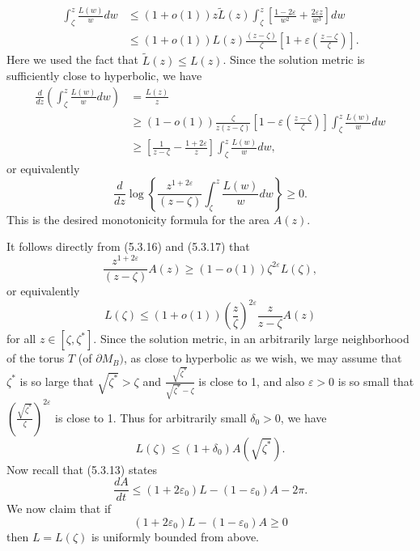 \begin{align*}
\int_{\zeta}^{z} \frac{L(w)}{w}dw &  \leq (1+o(1))
z\tilde{L}(z)\int_{\zeta}^{z}
\left[\frac{1-2\varepsilon}{w^2}+\frac{2\varepsilon z}{w^3}\right]dw \\
& \leq (1+o(1))L(z)\frac{(z-\zeta)}{\zeta}
\left[1+\varepsilon\left(\frac{z-\zeta}{\zeta}\right)\right].
\end{align*}
Here we used the fact that $\tilde{L}(z)\leq L(z)$. Since the
solution metric is sufficiently close to hyperbolic, we have
\begin{align*}
\frac{d}{dz}\left(\int_{\zeta}^{z}\frac{L(w)}{w}dw\right)
&  = \frac{L(z)}{z}\\
& \geq(1-o(1))\frac{\zeta}{z(z-\zeta)}
\left[1-\varepsilon\left(\frac{z-\zeta}{\zeta}\right)\right]
\int_{\zeta}^{z}\frac{L(w)}{w}dw \\
&  \geq\left[\frac{1}{z-\zeta}-\frac{1+2\varepsilon}{z}\right]
\int_{\zeta}^{z}\frac{L(w)}{w}dw,
\end{align*}
or equivalently \begin{equation} \frac{d}{dz}\log\left\{
\frac{z^{1+2\varepsilon}}{(z-\zeta)}
\int_{\zeta}^{z}\frac{L(w)}{w}dw\right\}\geq 0.
\end{equation} This is the desired monotonicity formula for the area $A(z)$.

It follows directly from (5.3.16) and (5.3.17) that
$$
\frac{z^{1+2\varepsilon}}{(z-\zeta)}A(z)\geq
(1-o(1))\zeta^{2\varepsilon}L(\zeta),
$$
or equivalently
$$
L(\zeta)\leq (1+o(1))
\left(\frac{z}{\zeta}\right)^{2\varepsilon}\frac{z}{z-\zeta} A(z)
$$
for all $z\in [\zeta,\zeta^{\ast}]$. Since the solution metric, in
an arbitrarily large neighborhood of the torus $T$ (of $\partial
M_B)$, as close to hyperbolic as we wish, we may assume that
${\zeta}^{\ast}$ is so large that $\sqrt{\zeta^{\ast}}>\zeta$ and
$\frac{\sqrt{\zeta^{\ast}}}{\sqrt{\zeta^{\ast}}-\zeta}$ is close
to 1, and also $\varepsilon >0$ is so small that
$(\frac{\sqrt{\zeta^{\ast}}}{\zeta})^{2\varepsilon}$ is close to
1. Thus for arbitrarily small $\delta_0 > 0$, we have \begin{equation}
L(\zeta)\leq (1+\delta_0)A\left(\sqrt{\zeta^{\ast}}\right). %
\end{equation} Now recall that (5.3.13) states
$$
\frac{dA}{dt}\leq (1+2\varepsilon_0)L-(1-\varepsilon_0)A-2\pi.
$$
We now claim that if
$$
(1+2\varepsilon_0)L-(1-\varepsilon_0)A\geq 0
$$
then $L=L(\zeta)$ is uniformly bounded from above.

